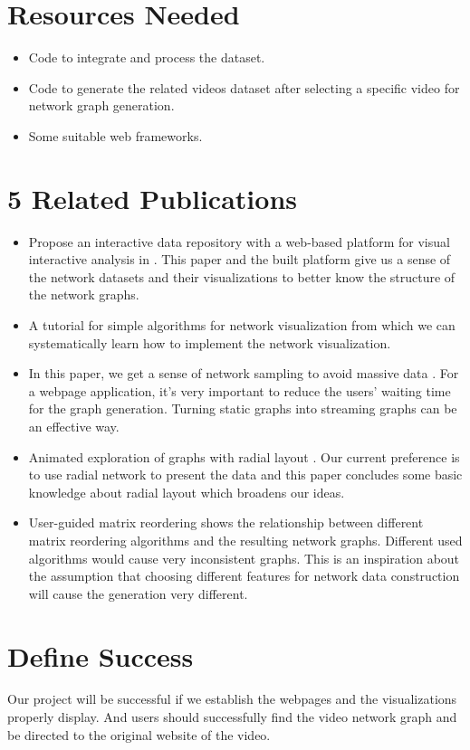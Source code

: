 \documentclass{proc}
\begin{document}
\section{Resources Needed}
\begin{itemize}
    \item Code to integrate and process the dataset.
    \item Code to generate the related videos dataset after selecting a specific video for network graph generation.
    \item Some suitable web frameworks.
\end{itemize}

\section{5 Related Publications}
\begin{itemize}
    \item Propose an interactive data repository with a web-based platform for visual interactive analysis in \cite{rossi2015network}. This paper and the built platform give us a sense of the network datasets and their visualizations to better know the structure of the network graphs.
    \item A tutorial for simple algorithms for network visualization \cite{mcguffin2012simple} from which we can systematically learn how to implement the network visualization.
    \item In this paper, we get a sense of network sampling to avoid massive data \cite{ahmed2013network}. For a webpage application, it's very important to reduce the users' waiting time for the graph generation. Turning static graphs into streaming graphs can be an effective way.
    \item Animated exploration of graphs with radial layout \cite{yee2001animated}. Our current preference is to use radial network to present the data and this paper concludes some basic knowledge about radial layout which broadens our ideas.
    \item User-guided matrix reordering \cite{behrisch2019guiro} shows the relationship between different matrix reordering algorithms and the resulting network graphs. Different used algorithms would cause very inconsistent graphs. This is an inspiration about the assumption that choosing different features for network data construction will cause the generation very different.
\end{itemize}


\section{Define Success}

Our project will be successful if we establish the webpages and the visualizations properly display. And users should successfully find the video network graph and be directed to the original website of the video.



\end{document}
